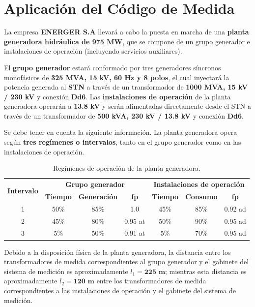 \section{Aplicación del Código de Medida} \label{sec:aplicacion}
La empresa \textbf{ENERGER S.A} llevará a cabo la puesta en marcha de una \textbf{planta generadora hidráulica de 975 MW}, que se compone de un grupo generador e instalaciones de operación (incluyendo servicios auxiliares).

El \textbf{grupo generador} estará conformado por tres generadores síncronos monofásicos de \textbf{325 MVA, 15 kV, 60 Hz y 8 polos}, el cual inyectará la potencia generada al \textbf{STN} a través de un transformador de \textbf{1000 MVA, 15 kV / 230 kV} y conexión \textbf{Dd6}. Las \textbf{instalaciones de operación} de la planta generadora operarán a \textbf{13.8 kV} y serán alimentadas directamente desde el STN a través de un transformador de \textbf{500 kVA, 230 kV / 13.8 kV} y conexión \textbf{Dd6}.

Se debe tener en cuenta la siguiente información. La planta generadora opera según \textbf{tres regímenes o intervalos}, tanto en el grupo generador como en las instalaciones de operación.

\begin{table}[t]
  \centering
  \caption{Regímenes de operación de la planta generadora.}
  \label{tab:regimenes_operacion}
  \begin{tabular}{ccccccc}
    \toprule
    \multirow{2}{*}{\textbf{Intervalo}} & \multicolumn{3}{c}{\textbf{Grupo generador}} & \multicolumn{3}{c}{\textbf{Instalaciones de operación}} \\
    \cmidrule(lr){2-4} \cmidrule(lr){5-7}
    & \textbf{Tiempo} & \textbf{Generación} & \textbf{fp} & \textbf{Tiempo} & \textbf{Consumo} & \textbf{fp} \\
    \midrule
    1 & 50\% & 85\% & 1.0 & 45\% & 85\% & 0.92 ad \\
    2 & 45\% & 80\% & 0.95 at & 50\% & 90\% & 0.95 ad \\
    3 & 5\% & 50\% & 0.91 at & 5\% & 70\% & 0.95 ad \\
    \bottomrule
  \end{tabular}
\end{table}

Debido a la disposición física de la planta generadora, la distancia entre los transformadores de medida correspondientes al grupo generador y el gabinete del sistema de medición es aproximadamente $l_1= \mathbf{225 \text{ m}}$; mientras esta distancia es aproximadamente $l_2 = \mathbf{120 \text{ m}}$ entre los transformadores de medida correspondientes a las instalaciones de operación y el gabinete del sistema de medición.

